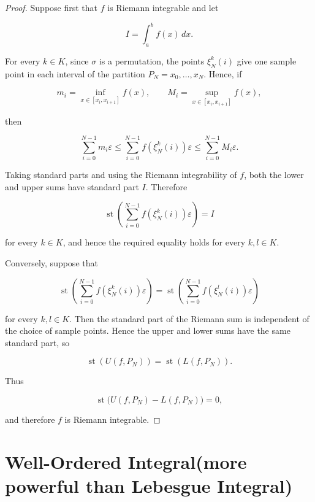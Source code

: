 \documentclass[10pt,a4paper]{book}
\begin{document}
\begin{proof}
    Suppose first that $f$ is Riemann integrable and let

    $$
        I=\int_a^b f(x)\,dx.
    $$

    For every $k\in K$, since $\sigma$ is a permutation, the points $\xi_N^k(i)$
    give one sample point in each interval of the partition $P_N={x_0,\ldots,x_N}$.
    Hence, if

    $$
        m_i=\inf_{x\in[x_i,x_{i+1}]}f(x),
        \qquad
        M_i=\sup_{x\in[x_i,x_{i+1}]}f(x),
    $$

    then

    $$
        \sum_{i=0}^{N-1}m_i\varepsilon
        \leq
        \sum_{i=0}^{N-1}f(\xi_N^k(i))\varepsilon
        \leq
        \sum_{i=0}^{N-1}M_i\varepsilon.
    $$

    Taking standard parts and using the Riemann integrability of $f$, both the
    lower and upper sums have standard part $I$. Therefore

    $$
        \operatorname{st}\left(
        \sum_{i=0}^{N-1}f(\xi_N^k(i))\varepsilon
        \right)=I
    $$

    for every $k\in K$, and hence the required equality holds for every $k,l\in K$.

    Conversely, suppose that

    $$
        \operatorname{st}\left(
        \sum_{i=0}^{N-1}f(\xi_N^k(i))\varepsilon
        \right)
        =
        \operatorname{st}\left(
        \sum_{i=0}^{N-1}f(\xi_N^l(i))\varepsilon
        \right)
    $$

    for every $k,l\in K$. Then the standard part of the Riemann sum is independent
    of the choice of sample points. Hence the upper and lower sums have the same
    standard part, so

    $$
        \operatorname{st}(U(f,P_N))
        =
        \operatorname{st}(L(f,P_N)).
    $$

    Thus

    $$
        \operatorname{st}\bigl(U(f,P_N)-L(f,P_N)\bigr)=0,
    $$

    and therefore $f$ is Riemann integrable.
\end{proof}

\chapter{Well-Ordered Integral{\small(more powerful than Lebesgue Integral)\small}}
\end{document}
